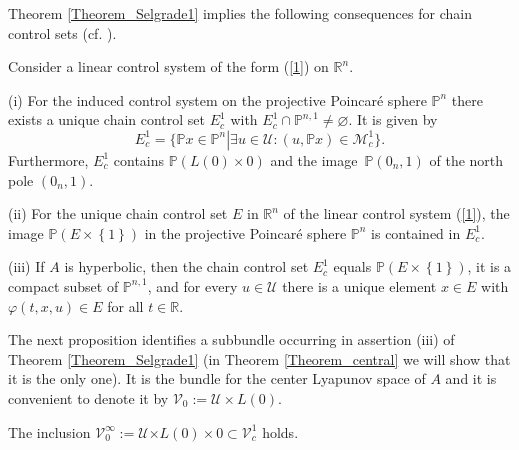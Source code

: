 \documentclass{siamltex}%
\begin{document}
Theorem \ref{Theorem_Selgrade1} implies the following consequences for chain
control sets (cf. \cite[Theorem 35]{ColS23}).

\begin{corollary}
\label{Corollary_splitE}Consider a linear control system of the form (\ref{1})
on $\mathbb{R}^{n}$.

(i) For the induced control system on the projective Poincar\'{e} sphere
$\mathbb{P}^{n}$ there exists a unique chain control set $E_{c}^{1}$ with
$E_{c}^{1}\cap\mathbb{P}^{n,1}\not =\varnothing$. It is given by%
\[
E_{c}^{1}=\{\mathbb{P}x\in\mathbb{P}^{n}\left\vert \exists u\in\mathcal{U}%
:(u,\mathbb{P}x)\in\mathcal{M}_{c}^{1}\right.  \}.
\]
Furthermore, $E_{c}^{1}$ contains $\mathbb{P}\left(  L(0)\times0\right)  $ and
the image~$\mathbb{P}\left(  0_{n},1\right)  $ of the north pole $(0_{n},1)$.

(ii) For the unique chain control set $E$ in $\mathbb{R}^{n}$ of the linear
control system (\ref{1}), the image $\mathbb{P}\left(  E\times\left\{
1\right\}  \right)  $ in the projective Poincar\'{e} sphere $\mathbb{P}^{n}$
is contained in $E_{c}^{1}$.

(iii) If $A$ is hyperbolic, then the chain control set $E_{c}^{1}$ equals
$\mathbb{P}(E\times\left\{  1\right\}  )$, it is a compact subset of
$\mathbb{P}^{n,1}$, and for every $u\in\mathcal{U}$ there is a unique element
$x\in E$ with $\varphi(t,x,u)\in E$ for all $t\in\mathbb{R}$.
\end{corollary}

The next proposition identifies a subbundle occurring in assertion (iii) of
Theorem \ref{Theorem_Selgrade1} (in Theorem \ref{Theorem_central}\textbf{ }we
will show that it is the only one). It is the bundle for the center Lyapunov
space of $A$ and it is convenient to denote it by $\mathcal{V}_{0}%
:=\mathcal{U}\times L(0).$

\begin{proposition}
\label{Proposition_in}The inclusion $\mathcal{V}_{0}^{\infty}:=\mathcal{U}%
\mathbf{\times}L(0)\times0\subset\mathcal{V}_{c}^{1}$ holds$.$
\end{proposition}
\end{document}

